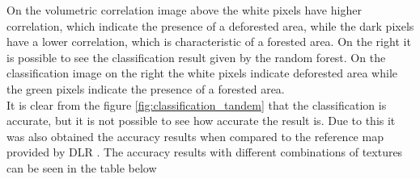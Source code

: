 On the volumetric correlation image above the white pixels have higher correlation, which indicate the presence of a deforested area, while the dark pixels have a lower correlation, which is characteristic of a forested area. On the right it is possible to see the classification result given by the random forest. On the classification image on the right the white pixels indicate deforested area while the green pixels indicate the presence of a forested area. \\
It is clear from the figure \ref{fig:classification_tandem} that the classification is accurate, but it is not possible to see how accurate the result is. Due to this it was also obtained the accuracy results when compared to the reference map provided by DLR %
. The accuracy results with different combinations of textures can be seen in the table below

